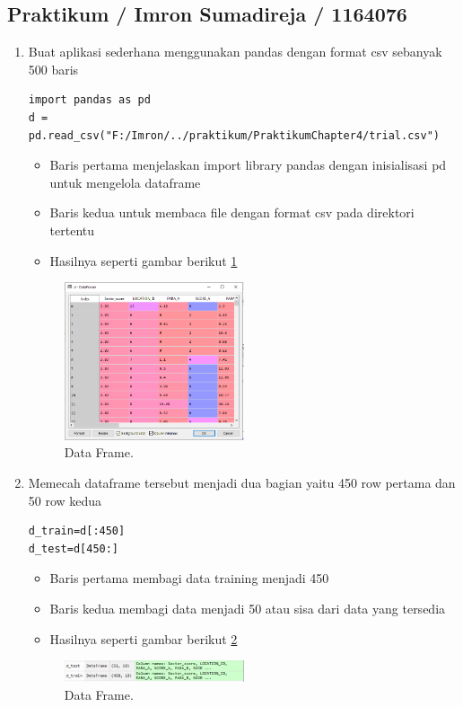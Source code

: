 \subsection{Praktikum / Imron Sumadireja / 1164076}
\begin{enumerate}
\item Buat aplikasi sederhana menggunakan pandas dengan format csv sebanyak 500 baris \par
\begin{verbatim}
import pandas as pd
d = pd.read_csv("F:/Imron/../praktikum/PraktikumChapter4/trial.csv")
\end{verbatim}
\begin{itemize}
\item Baris pertama menjelaskan import library pandas dengan inisialisasi pd untuk mengelola dataframe
\item Baris kedua untuk membaca file dengan format csv pada direktori tertentu
\item Hasilnya seperti gambar berikut \ref{df1}
\end{itemize}
		\begin{figure}[ht]
		\centerline{\includegraphics[width=0.5\textwidth]{figures/im/df1.png}}
		\caption{Data Frame.}
		\label{df1}
		\end{figure}

\item Memecah dataframe tersebut menjadi dua bagian yaitu 450 row pertama dan 50 row kedua \par
\begin{verbatim}
d_train=d[:450]
d_test=d[450:]
\end{verbatim}
\begin{itemize}
\item Baris pertama membagi data training menjadi 450
\item Baris kedua membagi data menjadi 50 atau sisa dari data yang tersedia
\item Hasilnya seperti gambar berikut \ref{df2}
\end{itemize}
		\begin{figure}[ht]
		\centerline{\includegraphics[width=0.5\textwidth]{figures/im/df2.png}}
		\caption{Data Frame.}
		\label{df2}
		\end{figure}


\end{enumerate}
